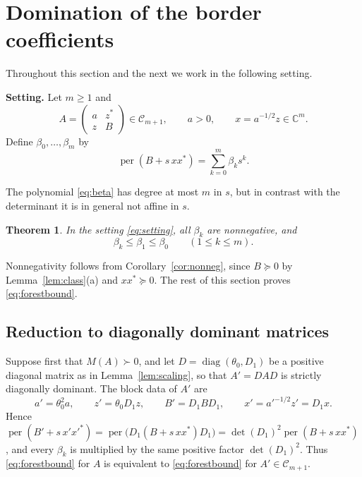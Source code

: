 \documentclass[11pt]{amsart}
\newtheorem{theorem}{Theorem}[section]
\theoremstyle{remark}
\numberwithin{equation}{section}
\newcommand{\per}{\operatorname{per}}
\newcommand{\diag}{\operatorname{diag}}
\newcommand{\cC}{\mathcal{C}}
\newcommand{\C}{\mathbb{C}}
\begin{document}
\section{Domination of the border coefficients}\label{sec:forest}

Throughout this section and the next we work in the following setting.

\medskip
\noindent\textbf{Setting.} Let $m\ge1$ and
\begin{equation}\label{eq:setting}
A=\begin{pmatrix}a&z^*\\ z&B\end{pmatrix}\in\cC_{m+1},\qquad a>0,\qquad x=a^{-1/2}z\in\C^m.
\end{equation}
Define $\beta_0,\dots,\beta_m$ by
\begin{equation}\label{eq:beta}
\per(B+s\,xx^*)=\sum_{k=0}^m\beta_ks^k.
\end{equation}
\medskip

The polynomial \eqref{eq:beta} has degree at most $m$ in $s$, but in contrast with the determinant it is in general not affine in $s$.

\begin{theorem}\label{thm:forest}
In the setting \eqref{eq:setting}, all $\beta_k$ are nonnegative, and
\begin{equation}\label{eq:forestbound}
\beta_k\le\beta_1\le\beta_0\qquad(1\le k\le m).
\end{equation}
\end{theorem}

Nonnegativity follows from Corollary~\ref{cor:nonneg}, since $B\succeq0$ by Lemma~\ref{lem:class}(a) and $xx^*\succeq0$. The rest of this section proves \eqref{eq:forestbound}.

\subsection{Reduction to diagonally dominant matrices}\label{subsec:reduction}

Suppose first that $M(A)\succ0$, and let $D=\diag(\theta_0,D_1)$ be a positive diagonal matrix as in Lemma~\ref{lem:scaling}, so that $A'=DAD$ is strictly diagonally dominant. The block data of $A'$ are
\[
a'=\theta_0^2a,\qquad z'=\theta_0D_1z,\qquad B'=D_1BD_1,\qquad x'=a'^{-1/2}z'=D_1x .
\]
Hence $\per(B'+s\,x'x'^*)=\per\bigl(D_1(B+s\,xx^*)D_1\bigr)=\det(D_1)^2\per(B+s\,xx^*)$, and every $\beta_k$ is multiplied by the same positive factor $\det(D_1)^2$. Thus \eqref{eq:forestbound} for $A$ is equivalent to \eqref{eq:forestbound} for $A'\in\cC_{m+1}$.
\end{document}
